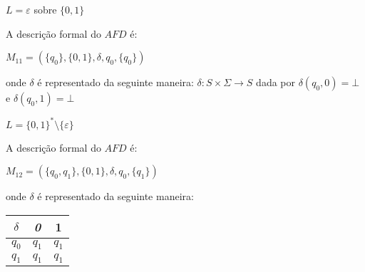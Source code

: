\documentclass{article}
\begin{document}
\begin{prob}
  $L = {\varepsilon}$ sobre $\{0,1\}$

  \begin{center}
  \end{center}

  A descrição formal do $AFD$ é:
  \begin{center}
    $M_{11} = (\{q_{0}\}, \{0,1\},\delta, q_{0}, \{q_0\})$
  \end{center}
  onde $\delta$ é representado da seguinte maneira: $\delta:S\times \Sigma\to S$ dada por $\delta(q_0,0)=\bot$ e $\delta(q_0,1)=\bot$
\end{prob}

\begin{prob}
  $L = \{0, 1\}^{*} \setminus \{\varepsilon\}$

  \begin{center}
  \end{center}

  A descrição formal do $AFD$ é:
  \begin{center}
    $M_{12} = (\{q_{0},q_1\}, \{0,1\},\delta, q_{0}, \{q_1\})$
  \end{center}
  onde $\delta$ é representado da seguinte maneira:
  \begin{table}[htbp]
    \centering
    \begin{tabular}{c|cc}
      \textit{$\delta$} & \textit{0} & 1       \\ \hline
      $q_{0}$           & $q_{1}$    & $q_{1}$ \\
      $q_{1}$           & $q_{1}$    & $q_{1}$
    \end{tabular}
  \end{table}
\end{prob}
\end{document}
